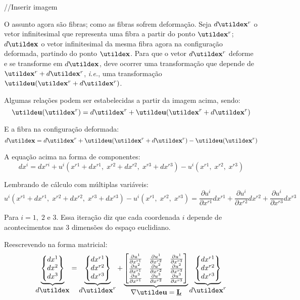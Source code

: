 //Inserir imagem

O assunto agora são fibras; como as fibras sofrem deformação. Seja $d\vt{x}^r$ o vetor infinitesimal que representa uma fibra a partir do ponto $\vt{x}^r$; $d\vt{x}$ o vetor infinitesimal da mesma fibra agora na configuração deformada, partindo do ponto $\vt{x}$.
Para que o vetor $d\vt{x}^r$ deforme e se transforme em $d\vt{x}$, deve ocorrer uma transformação que depende de $\vt{x}^r+d\vt{x}^r$, \textit{i.e.}, uma transformação $\vt{u}(\vt{x}^r+d\vt{x}^r)$.

Algumas relações podem ser estabelecidas a partir da imagem acima, sendo:
\[\vt{u}(\vt{x}^r)=d\vt{x}^r+\vt{u}(\vt{x}^r+d\vt{x}^r)\]

E a fibra na configuração deformada:	
\[d\vt{x}=d\vt{x}^r+\vt{u}(\vt{x}^r+d\vt{x}^r)-\vt{u}(\vt{x}^r)\]

A equação acima na forma de componentes:
\[dx^i=dx^{ri}+u^i(x^{r1}+dx^{r1},\;x^{r2}+dx^{r2},\;x^{r3}+dx^{r3})-u^i(x^{r1},\;x^{r2},\;x^{r3})\]

Lembrando de cálculo com múltiplas variáveis:
\[u^i(x^{r1}+dx^{r1},\;x^{r2}+dx^{r2},\;x^{r3}+dx^{r3})-u^i(x^{r1},\;x^{r2},\;x^{r3})=\frac{\partial u^i}{\partial x^{r1}}dx^{r1}+\frac{\partial u^i}{\partial x^{r2}}dx^{r2}+\frac{\partial u^i}{\partial x^{r3}}dx^{r3}\]

Para $i=1,\;2$ e $3$. Essa iteração diz que cada coordenada $i$ depende de acontecimentos nas $3$ dimensões do espaço euclidiano.

Reescrevendo na forma matricial:
\[
	\underbrace{
	\begin{Bmatrix}
		dx^1 \\ dx^2 \\ dx^3
	\end{Bmatrix}
	}_{\displaystyle d\vt{x}}
	=
	\underbrace{
	\begin{Bmatrix}
		dx^{r1} \\ dx^{r2} \\ dx^{r3}
	\end{Bmatrix}
	}_{\displaystyle d\vt{x}^r}
	+
	\underbrace{
	\begin{bmatrix}
		\frac{\partial u^1}{\partial x^{r1}} & \frac{\partial u^1}{\partial x^{r2}} & \frac{\partial u^1}{\partial x^{r3}} \\
		\frac{\partial u^2}{\partial x^{r1}} & \frac{\partial u^2}{\partial x^{r2}} & \frac{\partial u^2}{\partial x^{r3}} \\
		\frac{\partial u^3}{\partial x^{r1}} & \frac{\partial u^3}{\partial x^{r2}} & \frac{\partial u^3}{\partial x^{r3}}
	\end{bmatrix}
	}_{\displaystyle\nabla\vt{u}=\ts{L}}
	\underbrace{
	\begin{Bmatrix}
		dx^{r1} \\ dx^{r2} \\ dx^{r3}
	\end{Bmatrix}
	}_{\displaystyle d\vt{x}^r}
\]

